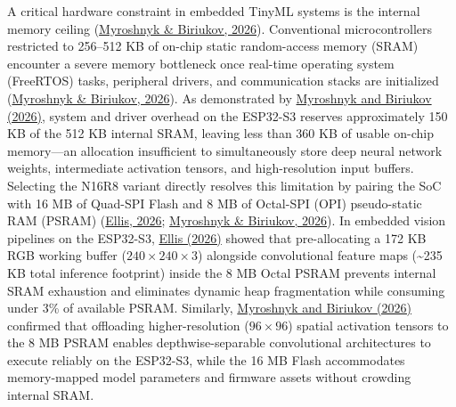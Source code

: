 \begin{thesisprose}
A critical hardware constraint in embedded TinyML systems is the internal memory ceiling (\hyperlink{cite.myroshnyk2026}{Myroshnyk \& Biriukov, 2026}). Conventional microcontrollers restricted to 256–512 KB of on-chip static random-access memory (SRAM) encounter a severe memory bottleneck once real-time operating system (FreeRTOS) tasks, peripheral drivers, and communication stacks are initialized (\hyperlink{cite.myroshnyk2026}{Myroshnyk \& Biriukov, 2026}). As demonstrated by \hyperlink{cite.myroshnyk2026}{Myroshnyk and Biriukov (2026)}, system and driver overhead on the ESP32-S3 reserves approximately 150 KB of the 512 KB internal SRAM, leaving less than 360 KB of usable on-chip memory—an allocation insufficient to simultaneously store deep neural network weights, intermediate activation tensors, and high-resolution input buffers. Selecting the N16R8 variant directly resolves this limitation by pairing the SoC with 16 MB of Quad-SPI Flash and 8 MB of Octal-SPI (OPI) pseudo-static RAM (PSRAM) (\hyperlink{cite.ellis2026}{Ellis, 2026}; \hyperlink{cite.myroshnyk2026}{Myroshnyk \& Biriukov, 2026}). In embedded vision pipelines on the ESP32-S3, \hyperlink{cite.ellis2026}{Ellis (2026)} showed that pre-allocating a 172 KB RGB working buffer (\(240 \times 240 \times 3\)) alongside convolutional feature maps (\textasciitilde{}235 KB total inference footprint) inside the 8 MB Octal PSRAM prevents internal SRAM exhaustion and eliminates dynamic heap fragmentation while consuming under 3\% of available PSRAM. Similarly, \hyperlink{cite.myroshnyk2026}{Myroshnyk and Biriukov (2026)} confirmed that offloading higher-resolution (\(96 \times 96\)) spatial activation tensors to the 8 MB PSRAM enables depthwise-separable convolutional architectures to execute reliably on the ESP32-S3, while the 16 MB Flash accommodates memory-mapped model parameters and firmware assets without crowding internal SRAM.


\end{thesisprose}
